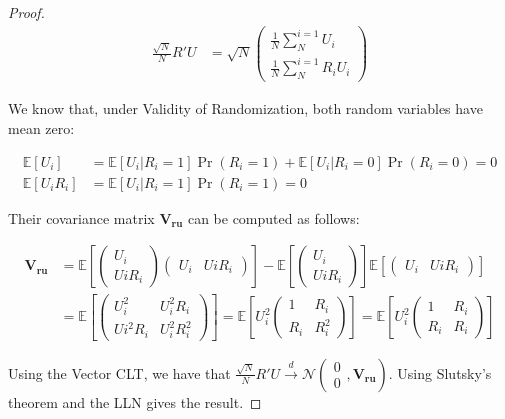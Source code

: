 \documentclass[
]{book}
\newcommand{\esp}[1]{\mathbb{E}[ #1 ]}
\theoremstyle{definition}
\theoremstyle{definition}
\theoremstyle{definition}
\theoremstyle{definition}
\theoremstyle{remark}
\begin{document}
\begin{proof}
\begin{align*}
\frac{\sqrt{N}}{N}R'U & = \sqrt{N}\left(\begin{array}{c}  \frac{1}{N}\sum^{i=1}_{N}U_i\\  \frac{1}{N}\sum^{i=1}_{N}R_iU_i\end{array}\right)
\end{align*}

We know that, under Validity of Randomization, both random variables have mean zero:

\begin{align*}
\esp{U_i}& = \esp{U_i|R_i=1}\Pr(R_i=1)+\esp{U_i|R_i=0}\Pr(R_i=0)=0 \\
\esp{U_iR_i}& = \esp{U_i|R_i=1}\Pr(R_i=1)=0
\end{align*}

Their covariance matrix \(\mathbf{V_{ru}}\) can be computed as follows:

\begin{align*}
\mathbf{V_{ru}} & = \esp{\left(\begin{array}{c}  U_i\\  UiR_i\end{array}\right)\left(\begin{array}{cc}  U_i&    UiR_i\end{array}\right)}
                  - \esp{\left(\begin{array}{c} U_i\\   UiR_i\end{array}\right)}\esp{\left(\begin{array}{cc}    U_i&    UiR_i\end{array}\right)}\\
                & = \esp{\left(\begin{array}{cc}    U_i^2 & U_i^2R_i\\  Ui^2R_i & U_i^2R_i^2\end{array}\right)} 
                  = \esp{U_i^2\left(\begin{array}{cc}   1 & R_i\\   R_i & R_i^2\end{array}\right)} 
                  = \esp{U_i^2\left(\begin{array}{cc}   1 & R_i\\   R_i & R_i\end{array}\right)} 
\end{align*}

Using the Vector CLT, we have that \(\frac{\sqrt{N}}{N}R'U\stackrel{d}{\rightarrow}\mathcal{N}\left(\begin{array}{c} 0\\ 0\end{array},\mathbf{V_{ru}}\right)\).
Using Slutsky's theorem and the LLN gives the result.
\end{proof}
\end{document}
